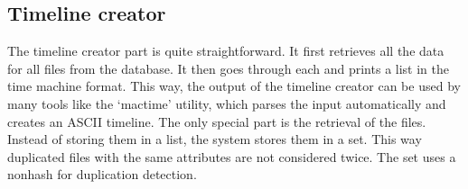 \subsection{Timeline creator}
\label{sec:Timeliner}

The timeline creator part is quite straightforward. It first retrieves all the data for all files from the database. It then goes through each and prints a list in the time machine format. This way, the output of the timeline creator can be used by many tools like the `mactime' utility, which parses the input automatically and creates an ASCII timeline. The only special part is the retrieval of the files. Instead of storing them in a list, the system stores them in a set. This way duplicated files with the same attributes are not considered twice. The set uses a \gls{nonhash} for duplication detection.
